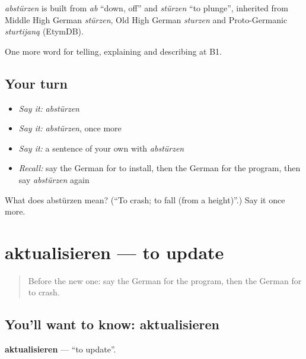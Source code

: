 \begin{cousinweb}
\emph{abstürzen} is built from \emph{ab} \textquotedblleft{}down, off\textquotedblright{} and \emph{stürzen} \textquotedblleft{}to plunge\textquotedblright{}, inherited from Middle High German \emph{stürzen}, Old High German \emph{sturzen} and Proto-Germanic \emph{sturtijaną} (EtymDB).
\end{cousinweb}

\begin{grammarlens}[title={What you've built}]
One more word for telling, explaining and describing at B1.
\end{grammarlens}

\subsection*{Your turn}
\begin{itemize}
\raggedright
  \item \emph{Say it:} \emph{abstürzen}
  \item \emph{Say it:} \emph{abstürzen}, once more
  \item \emph{Say it:} a sentence of your own with \emph{abstürzen}
  \item \emph{Recall:} say the German for to install, then the German for the program, then say \emph{abstürzen} again
\end{itemize}

\begin{tcolorbox}[breakable,colback=teal!4,colframe=teal!35!black,title={Before you move on}]
What does abstürzen mean? (\textquotedblleft{}To crash; to fall (from a height)\textquotedblright{}.) Say it once more.
\end{tcolorbox}
\section[aktualisieren]{aktualisieren — to update}

\label{lesson:GE-C397-aktualisieren}



\begin{quote}
Before the new one: say the German for the program, then the German for to crash.
\end{quote}

\subsection*{You'll want to know: aktualisieren}
\textbf{aktualisieren} — \textquotedblleft{}to update\textquotedblright{}.

